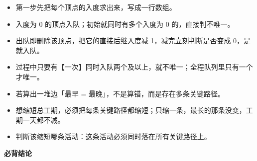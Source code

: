 \documentclass[10pt,a4paper]{ctexart}
\begin{document}

\begin{itemize}

\item 第一步先把每个顶点的入度求出来，写成一行数组。

\item 入度为 0 的顶点入队；初始就同时有多个入度为 0 的，直接判不唯一。

\item 出队即删除该顶点，把它的直接后继入度减 1，减完立刻判断是否变成 0，是就入队。

\item 过程中只要有【一次】同时入队两个及以上，就不唯一；全程队列里只有一个才唯一。

\end{itemize}


\begin{itemize}

\item 若算出一堆边「最早 = 最晚」，不是算错，而是存在多条关键路径。

\item 想缩短总工期，必须把每条关键路径都缩短；只缩一条，最长的那条没变，工期一天都不减。

\item 判断该缩短哪条活动：这条活动必须同时落在所有关键路径上。

\end{itemize}







\textbf{必背结论}
\end{document}
